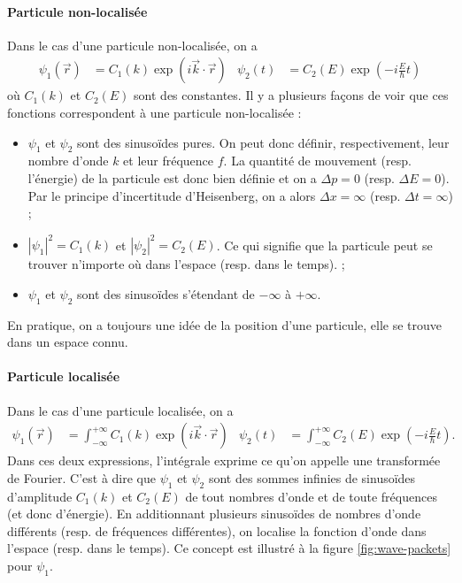 \paragraph{Particule non-localisée}
Dans le cas d'une particule non-localisée, on a
\begin{align*}
\psi_1(\vec{r}) &= C_1(k)\exp(i\vec{k}\cdot\vec{r}) 
& \psi_2(t) &= C_2(E)\exp(-i\frac{E}{\hbar}t)
\end{align*}
où $C_1(k)$ et $C_2(E)$ sont des constantes.
Il y a plusieurs façons de voir que ces fonctions
correspondent à une particule non-localisée :
\begin{itemize}
	\item $\psi_1$ et $\psi_2$ sont des sinusoïdes
	pures. On peut donc définir, respectivement,
	leur nombre d'onde $k$ et leur fréquence $f$. 
	La quantité de mouvement (resp. l'énergie) de 
	la particule est donc bien définie et on a 
	$\Delta p = 0$ (resp. $\Delta E = 0$). Par le 
	principe d'incertitude d'Heisenberg, on a alors
	$\Delta x = \infty$ (resp. $\Delta t = \infty$) ;
	\item $|\psi_1|^2 = C_1(k)$ et $|\psi_2|^2 = C_2(E)$. Ce 
	qui signifie que la particule peut se trouver
	n'importe où dans l'espace (resp. dans le temps). ;
	\item $\psi_1$ et $\psi_2$ sont des sinusoïdes
	s'étendant de $-\infty$ à $+\infty$.
\end{itemize}
En pratique, on a toujours une idée de la 
position d'une particule, elle se trouve dans
un espace connu.

\paragraph{Particule localisée}
Dans le cas d'une particule localisée, on a
\begin{align*}
\psi_1(\vec{r}) &= \int_{-\infty}^{+\infty} C_1(k)\exp(i\vec{k}\cdot\vec{r}) 
& \psi_2(t) &= \int_{-\infty}^{+\infty} C_2(E)\exp(-i\frac{E}{\hbar}t).
\end{align*}
Dans ces deux expressions, l'intégrale exprime ce qu'on
appelle une transformée de Fourier. C'est à dire que
$\psi_1$ et $\psi_2$ sont des sommes infinies de sinusoïdes
d'amplitude $C_1(k)$ et $C_2(E)$ de tout nombres d'onde et
de toute fréquences (et donc d'énergie). 
En additionnant plusieurs sinusoïdes de nombres d'onde
différents (resp. de fréquences différentes),
on localise la fonction d'onde dans l'espace (resp. 
dans le temps). Ce concept est illustré à la figure 
\ref{fig:wave-packets} pour $\psi_1$.

